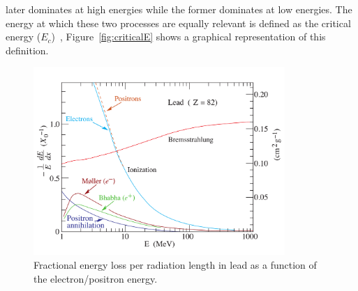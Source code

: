 later dominates at high energies while the former dominates at low
energies. The energy at which these two processes are equally relevant
is defined as the critical energy ($E_{c}$)~\cite{criticalE}, Figure~\ref{fig:criticalE}
shows a graphical representation of this definition.
\begin{figure}[h] \centering
\includegraphics[width=0.85\textwidth]{calorimetry/dEdx_electrons.pdf}
\caption{Fractional energy loss per radiation
  length in lead as a function of the electron/positron energy.}
\label{fig:electronEL}
\end{figure} 

